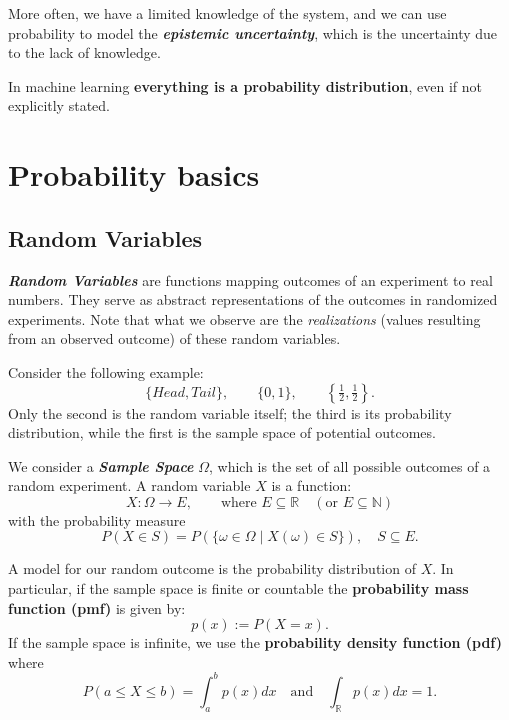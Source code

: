 More often, we have a limited knowledge of the system, and we can use probability to model the \textbf{\textit{epistemic uncertainty}}, which is the uncertainty due to the lack of knowledge.

\begin{tipsblock}
    In machine learning \textbf{everything is a probability distribution}, even if not explicitly stated.
\end{tipsblock}

\section{Probability basics}

\subsection{Random Variables}

\textbf{\textit{Random Variables}} are functions mapping outcomes of an experiment to real numbers. They serve as abstract representations of the outcomes in randomized experiments. Note that what we observe are the \textit{realizations} (values resulting from an observed outcome) of these random variables.

\begin{exampleblock}
Consider the following example:
$$
\{Head, Tail\}, \quad \quad
\{0, 1\}, \quad \quad
\left\{\tfrac{1}{2}, \tfrac{1}{2}\right\}.
$$
Only the second is the random variable itself; the third is its probability distribution, while the first is the sample space of potential outcomes.
\end{exampleblock}

We consider a \textbf{\textit{Sample Space}} $\Omega$, which is the set of all possible outcomes of a random experiment. A random variable $X$ is a function:
$$
X: \Omega \rightarrow E, \qquad \text{where } E \subseteq \mathbb{R} \quad (\text{or } E \subseteq \mathbb{N})
$$
with the probability measure 
$$
P(X \in S) = P(\{\omega \in \Omega \mid X(\omega) \in S\}), \quad S \subseteq E.
$$

A model for our random outcome is the probability distribution of $X$. In particular, if the sample space is finite or countable the \textbf{probability mass function (pmf)} is given by:
$$
p(x) := P(X=x).
$$
If the sample space is infinite, we use the \textbf{probability density function (pdf)} where
$$
P(a \leq X \leq b) = \int_a^b p(x)dx \quad \text{and} \quad \int_{\mathbb{R}} p(x)dx=1.
$$

